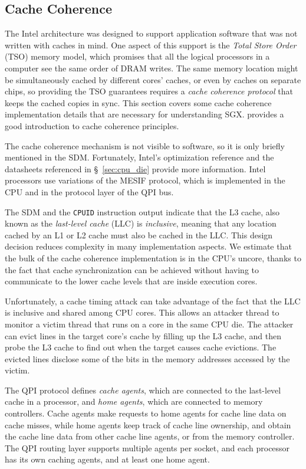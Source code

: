 \subsection{Cache Coherence}
\label{sec:cache_coherence}

The Intel architecture was designed to support application software that was
not written with caches in mind. One aspect of this support is the
\textit{Total Store Order} (TSO) \cite{owens2009tso} memory model, which
promises that all the logical processors in a computer see the same order of
DRAM writes. The same memory location might be simultaneously cached by
different cores' caches, or even by caches on separate chips, so providing the
TSO guarantees requires a \textit{cache coherence protocol} that keeps the
cached copies in sync. This section covers some cache coherence implementation
details that are necessary for understanding SGX.
\cite{hennessy2012architecture} provides a good introduction to cache coherence
principles.

The cache coherence mechanism is not visible to software, so it is only briefly
mentioned in the SDM. Fortunately, Intel's optimization reference
\cite{intel2014optimization} and the datasheets referenced in
\S~\ref{sec:cpu_die} provide more information. Intel processors use variations
of the MESIF \cite{goodman2009mesif} protocol, which is implemented in the CPU
and in the protocol layer of the QPI bus.

The SDM and the \texttt{CPUID} instruction output indicate that the L3 cache,
also known as the \textit{last-level cache} (LLC) is \textit{inclusive},
meaning that any location cached by an L1 or L2 cache must also be cached in
the LLC. This design decision reduces complexity in many implementation
aspects. We estimate that the bulk of the cache coherence implementation is in
the CPU's uncore, thanks to the fact that cache synchronization can be achieved
without having to communicate to the lower cache levels that are inside
execution cores.

Unfortunately, a cache timing attack can take advantage of the fact that the
LLC is inclusive and shared among CPU cores. This allows an attacker thread
to monitor a victim thread that runs on a core in the same CPU die. The
attacker can evict lines in the target core's cache by filling up the L3 cache,
and then probe the L3 cache to find out when the target causes cache evictions.
The evicted lines disclose some of the bits in the memory addresses accessed by
the victim.

The QPI protocol defines \textit{cache agents}, which are connected to the
last-level cache in a processor, and \textit{home agents}, which are connected
to memory controllers. Cache agents make requests to home agents for cache line
data on cache misses, while home agents keep track of cache line ownership, and
obtain the cache line data from other cache line agents, or from the memory
controller. The QPI routing layer supports multiple agents per socket, and each
processor has its own caching agents, and at least one home agent.


